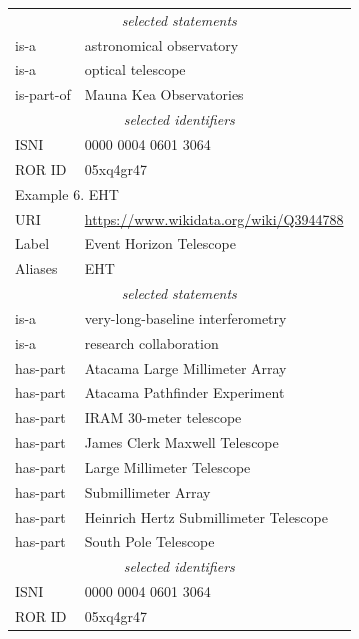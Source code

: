 \documentclass[11pt,a4paper]{ivoa}
\begin{document}
\begin{longtable}{p{}p{}}
\multicolumn{2}{c}{\sl selected statements}\\
is-a & astronomical observatory \\
is-a & optical telescope \\
is-part-of & Mauna Kea Observatories\\
\multicolumn{2}{c}{\sl selected identifiers}\\
ISNI       & 0000 0004 0601 3064\\
ROR ID     & 05xq4gr47 \\
\hline
\hline
\multicolumn{2}{l}{Example 6. EHT}\\
\hline
URI & \url{https://www.wikidata.org/wiki/Q3944788}\\
Label      & Event Horizon Telescope\\
Aliases    & EHT\\
\multicolumn{2}{c}{\sl selected statements}\\
is-a & very-long-baseline interferometry \\
is-a & research collaboration \\
has-part & Atacama Large Millimeter Array\\
has-part & Atacama Pathfinder Experiment\\
has-part & IRAM 30-meter telescope\\
has-part & James Clerk Maxwell Telescope\\
has-part & Large Millimeter Telescope\\
has-part & Submillimeter Array\\
has-part & Heinrich Hertz Submillimeter Telescope\\
has-part & South Pole Telescope\\
\multicolumn{2}{c}{\sl selected identifiers}\\
ISNI       & 0000 0004 0601 3064\\
ROR ID     & 05xq4gr47 \\
\hline
\end{longtable}
\end{document}
